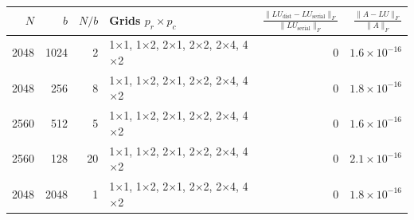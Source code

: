 \begin{tabular}{rrrlrr}
\toprule
$N$ & $b$ & $N/b$ & Grids $p_r \times p_c$ & $\frac{\|LU_{\mathrm{dist}} - LU_{\mathrm{serial}}\|_F}{\|LU_{\mathrm{serial}}\|_F}$ & $\frac{\|A - LU\|_F}{\|A\|_F}$ \\
\midrule
2048 & 1024 & 2 & 1$\times$1, 1$\times$2, 2$\times$1, 2$\times$2, 2$\times$4, 4$\times$2 & 0 & $1.6 \times 10^{-16}$ \\
2048 & 256 & 8 & 1$\times$1, 1$\times$2, 2$\times$1, 2$\times$2, 2$\times$4, 4$\times$2 & 0 & $1.8 \times 10^{-16}$ \\
2560 & 512 & 5 & 1$\times$1, 1$\times$2, 2$\times$1, 2$\times$2, 2$\times$4, 4$\times$2 & 0 & $1.6 \times 10^{-16}$ \\
2560 & 128 & 20 & 1$\times$1, 1$\times$2, 2$\times$1, 2$\times$2, 2$\times$4, 4$\times$2 & 0 & $2.1 \times 10^{-16}$ \\
2048 & 2048 & 1 & 1$\times$1, 1$\times$2, 2$\times$1, 2$\times$2, 2$\times$4, 4$\times$2 & 0 & $1.8 \times 10^{-16}$ \\
\bottomrule
\end{tabular}
